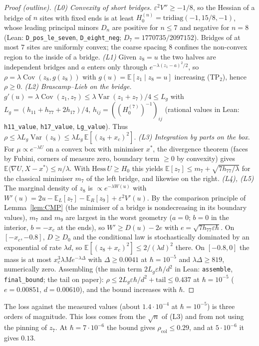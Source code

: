 \documentclass[11pt,a4paper]{article}
\theoremstyle{definition}
\theoremstyle{remark}
\newcommand{\E}{\mathbb{E}}
\newcommand{\Var}{\operatorname{Var}}
\newcommand{\Cov}{\operatorname{Cov}}
\newcommand{\xc}{x_c}
\newcommand{\rcol}{\rho_{\mathrm{col}}}
\newcommand{\code}[1]{\texttt{#1}}
\begin{document}
\begin{proof}[Proof (outline)]
\emph{(L0) Convexity of short bridges.} $\varepsilon^2V''\ge-1/8$, so the Hessian of a bridge of $n$ sites with fixed ends is at least $H_0^{(n)}=\mathrm{tridiag}(-1,15/8,-1)$, whose leading principal minors $D_n$ are positive for $n\le7$ and negative for $n=8$ (Lean: \code{D\_pos\_le\_seven}, \code{D\_eight\_neg}; $D_7=1770735/2097152$). Bridges of at most $7$ sites are uniformly convex; the coarse spacing $8$ confines the non-convex region to the inside of a bridge.
\emph{(L1)} Given $z_8=u$ the two halves are independent bridges and $a$ enters only through $e^{-\lambda(z_1-a)^2/2}$, so $\rho=\lambda\Cov(z_8,g(z_8))$ with $g(u)=\E[z_1\mid z_8=u]$ increasing (TP$_2$), hence $\rho\ge0$.
\emph{(L2) Brascamp--Lieb on the bridge.} $g'(u)=\lambda\Cov(z_1,z_7)\le\lambda\Var(z_1+z_7)/4\le L_g$ with $L_g=(h_{11}+h_{77}+2h_{17})/4$, $h_{ij}=((H_0^{(7)})^{-1})_{ij}$ (rational values in Lean: \code{h11\_value}, \code{h17\_value}, \code{Lg\_value}). Thus $\rho\le\lambda L_g\Var(z_8)\le\lambda L_g\,\E[(z_8+\xc)^2]$.
\emph{(L3) Integration by parts on the box.} For $\mu\propto e^{-\lambda U}$ on a convex box with minimiser $x^*$, the divergence theorem (faces by Fubini, corners of measure zero, boundary term $\ge0$ by convexity) gives $\E\langle\nabla U,X-x^*\rangle\le n/\lambda$. With $\mathrm{Hess}\,U\ge H_0$ this yields $\E[z_7]\le m_7+\sqrt{7h_{77}/\lambda}$ for the classical minimiser $m_7$ of the left bridge, and likewise on the right.
\emph{(L4), (L5)} The marginal density of $z_8$ is $\propto e^{-\lambda W(u)}$ with $W'(u)=2u-\E_L[z_7]-\E_R[z_9]+\varepsilon^2V'(u)$. By the comparison principle of Lemma~\ref{lem:CMP} (the minimiser of a bridge is nondecreasing in its boundary values), $m_7$ and $m_9$ are largest in the worst geometry ($a=0$; $b=0$ in the interior, $b=-\xc$ at the ends), so $W'\ge D(u)-2e$ with $e=\sqrt{7h_{77}\varepsilon\hbar}$. On $[-\xc,-0.8]$, $D\ge D_0$ and the conditional law is stochastically dominated by an exponential of rate $\lambda d$, so $\E[(z_8+\xc)^2]\le2/(\lambda d)^2$ there. On $[-0.8,0]$ the mass is at most $\xc^3\lambda M e^{-\lambda\Delta}$ with $\Delta\ge0.0041$ at $\hbar=10^{-5}$ and $\lambda\Delta\ge819$, numerically zero. Assembling (the main term $2L_g\varepsilon\hbar/d^2$ in Lean: \code{assemble}, \code{final\_bound}; the tail on paper): $\rho\le2L_g\varepsilon\hbar/d^2+\text{tail}\le0.437$ at $\hbar=10^{-5}$ ($e=0.00851$, $d=0.00610$), and the bound increases with $\hbar$.
\end{proof}
The loss against the measured values (about $1.4\cdot10^{-4}$ at $\hbar=10^{-5}$) is three orders of magnitude. This loss comes from the $\sqrt n$ of (L3) and from not using the pinning of $z_7$. At $\hbar=7\cdot10^{-6}$ the bound gives $\rcol\le0.29$, and at $5\cdot10^{-6}$ it gives $0.13$.
\end{document}
